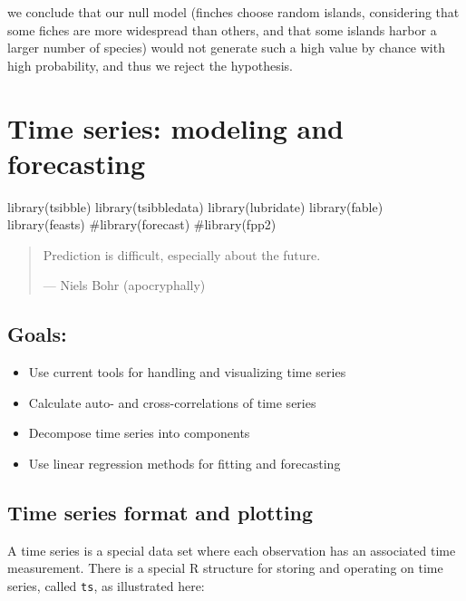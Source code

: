 \documentclass[
  letterpaper,
  DIV=11,
  numbers=noendperiod]{scrreprt}
\newenvironment{Shaded}{\begin{snugshade}}{\end{snugshade}}
\newcommand{\NormalTok}[1]{\textcolor[rgb]{0.00,0.23,0.31}{#1}}
\providecommand{\tightlist}{%
  \setlength{\itemsep}{0pt}\setlength{\parskip}{0pt}}\usepackage{longtable,booktabs,array}
\begin{document}
we conclude that our null model (finches choose random islands,
considering that some fiches are more widespread than others, and that
some islands harbor a larger number of species) would not generate such
a high value by chance with high probability, and thus we reject the
hypothesis.


\chapter{Time series: modeling and
forecasting}\label{time-series-modeling-and-forecasting}

\begin{Shaded}
\begin{Highlighting}[]
\NormalTok{library(tsibble)}
\NormalTok{library(tsibbledata)}
\NormalTok{library(lubridate)}
\NormalTok{library(fable)}
\NormalTok{library(feasts)}
\NormalTok{\#library(forecast)}
\NormalTok{\#library(fpp2)}
\end{Highlighting}
\end{Shaded}

\begin{quote}
Prediction is difficult, especially about the future.

--- Niels Bohr (apocryphally)
\end{quote}

\section{Goals:}\label{goals}

\begin{itemize}
\tightlist
\item
  Use current tools for handling and visualizing time series
\item
  Calculate auto- and cross-correlations of time series
\item
  Decompose time series into components
\item
  Use linear regression methods for fitting and forecasting
\end{itemize}

\section{Time series format and
plotting}\label{time-series-format-and-plotting}

A time series is a special data set where each observation has an
associated time measurement. There is a special R structure for storing
and operating on time series, called \texttt{ts}, as illustrated here:
\end{document}
